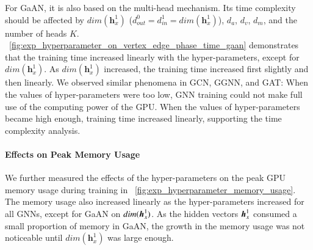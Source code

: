 For GaAN, it is also based on the multi-head mechanism.
%
Its time complexity should be affected by $dim(\boldsymbol{h}^1_x)$ ($d^0_{out} = d^1_{in} = dim(\boldsymbol{h}^1_x)$), $d_a$, $d_v$, $d_m$, and the number of heads $K$.
%
\figurename~\ref{fig:exp_hyperparameter_on_vertex_edge_phase_time_gaan} demonstrates that the training time increased linearly with the hyper-parameters, except for $dim(\boldsymbol{h}^1_x)$.
As $dim(\boldsymbol{h}^1_x)$ increased, the training time increased first slightly and then linearly.
We observed similar phenomena in GCN, GGNN, and GAT:
When the values of hyper-parameters were too low, GNN training could not make full use of the computing power of the GPU.
%
When the values of hyper-parameters became high enough, training time increased linearly, supporting the time complexity analysis.

\paragraph{Effects on Peak Memory Usage}

We further measured the effects of the hyper-parameters on the peak GPU memory usage during training in \figurename~\ref{fig:exp_hyperparameter_memory_usage}.
%
The memory usage also increased linearly as the hyper-parameters increased for all GNNs, except for GaAN on $dim(\boldsymbol{h}^1_x)$.
%
As the hidden vectors $\boldsymbol{h}^1_x$ consumed a small proportion of memory in GaAN, the growth in the memory usage was not noticeable until $dim(\boldsymbol{h}^1_x)$ was large enough.

